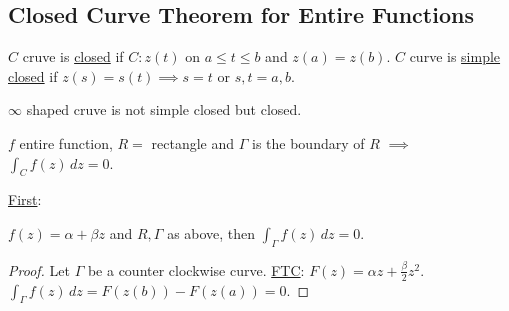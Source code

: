 \documentclass[]{article}
\begin{document}
\subsection{Closed Curve Theorem for Entire Functions}
\begin{definition}
	$C$ cruve is \underline{closed} if $C:z(t)$ on $a\leq t\leq b$ and $z(a) = z(b)$. $C$ curve is \underline{simple closed} if $z(s) = s(t) \implies s=t$ or $s,t=a,b$.
\end{definition}
\begin{example}
	$\infty$ shaped cruve is not simple closed but closed.
\end{example}
\begin{theorem}
	$f$ entire function, $R = $ rectangle and $\Gamma$ is the boundary of $R$ $\implies$ $\int_C f(z) \, dz  = 0$.
\end{theorem}
\underline{First}:
\begin{lemma}
	$f(z) = \alpha + \beta z$ and $R,\Gamma $ as above, then $\int_{\Gamma} f(z) \, dz = 0$.
\end{lemma}
\begin{proof}
	Let $\Gamma$ be a counter clockwise curve. \underline{FTC}: $F(z) = \alpha z + \frac{\beta}{2} z^2$. $\int_{\Gamma} f(z) \, dz = F(z(b)) - F(z(a)) = 0$.
\end{proof}
\end{document}
